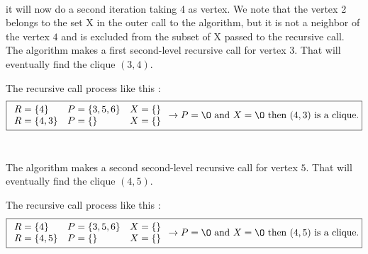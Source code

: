     \\
    \begin{minipage}{0.4\textwidth}
    \end{minipage}
    \begin{minipage}{0.6\textwidth}
        it will now do a second iteration taking 4 as vertex. We note that the vertex 2 belongs to the set X in the outer call to the algorithm, but it is not a neighbor of the vertex $4$ and is excluded from the subset of X passed to the recursive call. The algorithm makes a first second-level recursive call for vertex $3$. That will eventually find the clique $(3, 4)$.
    \end{minipage}
    The recursive call process like this  :
    $$ \boxed{
        \begin{array}{lll}
            R = \{4\} & P = \{3,5,6\} & X = \{\} \\
            R = \{4,3\} & P = \{\} & X = \{\} \\
        \end{array} 
        \rightarrow P = \O \text{ and } X = \O \text{ then } (4,3) \text{ is a clique.}
    }$$
    \\
    \begin{minipage}{0.4\textwidth}
    \end{minipage}
    \begin{minipage}{0.6\textwidth}
        The algorithm makes a second second-level recursive call for vertex $5$. That will eventually find the clique $(4,5)$.
    \end{minipage}
    The recursive call process like this  :
    $$ \boxed{
        \begin{array}{lll}
            R = \{4\} & P = \{3,5,6\} & X = \{\} \\
            R = \{4,5\} & P = \{\} & X = \{\} \\
        \end{array} 
        \rightarrow P = \O \text{ and } X = \O \text{ then } (4,5) \text{ is a clique.}
    }$$
